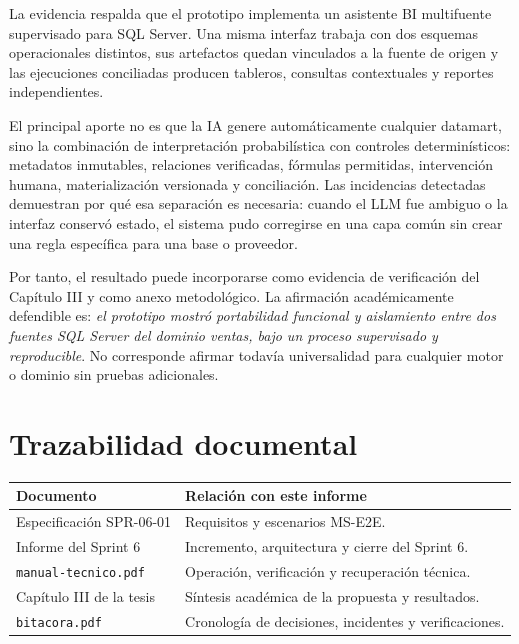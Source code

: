 \documentclass[11pt,letterpaper]{article}
\newcommand{\file}[1]{\texttt{#1}}
\begin{document}
La evidencia respalda que el prototipo implementa un asistente BI multifuente supervisado
para SQL Server. Una misma interfaz trabaja con dos esquemas operacionales distintos, sus
artefactos quedan vinculados a la fuente de origen y las ejecuciones conciliadas producen
tableros, consultas contextuales y reportes independientes.

El principal aporte no es que la IA genere automáticamente cualquier datamart, sino la
combinación de interpretación probabilística con controles determinísticos: metadatos
inmutables, relaciones verificadas, fórmulas permitidas, intervención humana,
materialización versionada y conciliación. Las incidencias detectadas demuestran por qué
esa separación es necesaria: cuando el LLM fue ambiguo o la interfaz conservó estado, el
sistema pudo corregirse en una capa común sin crear una regla específica para una base o
proveedor.

Por tanto, el resultado puede incorporarse como evidencia de verificación del Capítulo III
y como anexo metodológico. La afirmación académicamente defendible es: \emph{el prototipo
mostró portabilidad funcional y aislamiento entre dos fuentes SQL Server del dominio
ventas, bajo un proceso supervisado y reproducible}. No corresponde afirmar todavía
universalidad para cualquier motor o dominio sin pruebas adicionales.

\appendix
\section{Trazabilidad documental}

\begin{tabularx}{\textwidth}{@{}p{}X@{}}
\toprule
Documento & Relación con este informe \\
\midrule
Especificación SPR-06-01 & Requisitos y escenarios MS-E2E. \\
Informe del Sprint 6 & Incremento, arquitectura y cierre del Sprint 6. \\
\file{manual-tecnico.pdf} & Operación, verificación y recuperación técnica. \\
Capítulo III de la tesis & Síntesis académica de la propuesta y resultados. \\
\file{bitacora.pdf} & Cronología de decisiones, incidentes y verificaciones. \\
\bottomrule
\end{tabularx}
\end{document}
